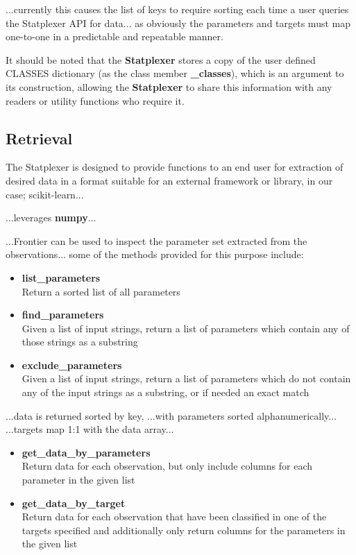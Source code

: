 ...currently this causes the list of keys to require sorting each time a user
queries the Statplexer API for data... as obviously the parameters and targets
must map one-to-one in a predictable and repeatable manner.

It should be noted that the \textbf{Statplexer} stores a copy of the user
defined CLASSES dictionary (as the class member \textbf{\_classes}), which is an
argument to its construction, allowing the \textbf{Statplexer} to share this
information with any readers or utility functions who require it.


\subsection{Retrieval}

The Statplexer is designed to provide functions to an end user for extraction
of desired data in a format suitable for an external framework or library,
in our case; scikit-learn...

...leverages \textbf{numpy}...

...Frontier can be used to inspect the parameter set extracted from the
observations... some of the methods provided for this purpose include:

\begin{itemize}
    \item \textbf{list\_parameters} \hfill\\
        Return a sorted list of all parameters
    \item \textbf{find\_parameters} \hfill\\
        Given a list of input strings, return a list of parameters which contain
        any of those strings as a substring
    \item \textbf{exclude\_parameters} \hfill\\
        Given a list of input strings, return a list of parameters which do not
        contain any of the input strings as a substring, or if needed an exact
        match
\end{itemize}

...data is returned sorted by key,
...with parameters sorted alphanumerically...
...targets map 1:1 with the data array...

\begin{itemize}
    \item \textbf{get\_data\_by\_parameters} \hfill\\
        Return data for each observation, but only include columns
        for each parameter in the given list
    \item \textbf{get\_data\_by\_target} \hfill\\
        Return data for each observation that have been classified in one of the
        targets specified and additionally only return columns for the
        parameters in the given list
\end{itemize}


